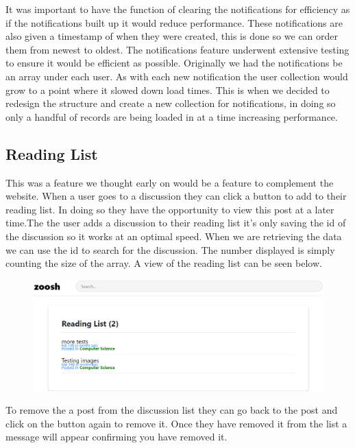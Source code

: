 It was important to have the function of clearing the notifications for efficiency as if the notifications built up it would reduce performance. These notifications are also given a timestamp of when they were created, this is done so we can order them from newest to oldest. The notifications feature underwent extensive testing to ensure it would be efficient as possible. Originally we had the notifications be an array under each user. As with each new notification the user collection would grow to a point where it slowed down load times. This is when we decided to redesign the structure and create a new collection for notifications, in doing so only a handful of records are being loaded in at a time increasing performance.

\subsection{Reading List}
This was a feature we thought early on would be a feature to complement the website. When a user goes to a discussion they can click a button to add to their reading list. In doing so they have the opportunity to view this post at a later time.The the user adds a discussion to their reading list it's only saving the id of the discussion so it works at an optimal speed. When we are retrieving the data we can use the id to search for the discussion. The number displayed is simply counting the size of the array. A view of the reading list can be seen below.
\begin{figure}[H]
  \centering
  \includegraphics[scale=0.55]{img/ReadingList.PNG}
  \label{fig:Readinglist}
\end{figure}
To remove the a post from the discussion list they can go back to the post and click on the button again to remove it. Once they have removed it from the list a message will appear confirming you have removed it.

